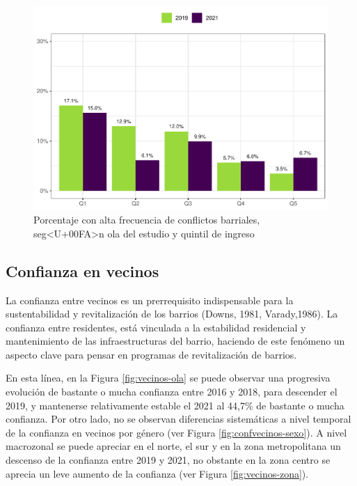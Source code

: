 \documentclass[
  12pt,
]{book}
\begin{document}
\begin{figure}

{\centering \includegraphics{reporte-elsoc_files/figure-latex/confli-quintil-1} 

}

\caption{Porcentaje con alta frecuencia de conflictos barriales, seg<U+00FA>n ola del estudio y quintil de ingreso}\label{fig:confli-quintil}
\end{figure}

\hypertarget{confianza-en-vecinos}{%
\subsection*{Confianza en vecinos}\label{confianza-en-vecinos}}

La confianza entre vecinos es un prerrequisito indispensable para la sustentabilidad y revitalización de los barrios (Downs, 1981, Varady,1986). La confianza entre residentes, está vinculada a la estabilidad residencial y mantenimiento de las infraestructuras del barrio, haciendo de este fenómeno un aspecto clave para pensar en programas de revitalización de barrios.

En esta línea, en la Figura \ref{fig:vecinos-ola} se puede observar una progresiva evolución de bastante o mucha confianza entre 2016 y 2018, para descender el 2019, y mantenerse relativamente estable el 2021 al 44,7\% de bastante o mucha confianza. Por otro lado, no se observan diferencias sistemáticas a nivel temporal de la confianza en vecinos por género (ver Figura \ref{fig:confvecinos-sexo}). A nivel macrozonal se puede apreciar en el norte, el sur y en la zona metropolitana un descenso de la confianza entre 2019 y 2021, no obstante en la zona centro se aprecia un leve aumento de la confianza (ver Figura \ref{fig:vecinos-zona}).
\end{document}
